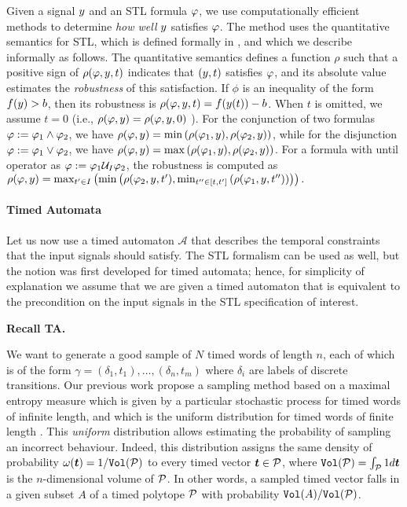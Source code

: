 Given a signal $y$ and an STL formula $\varphi$, we use computationally efficient methods to determine \emph{how well} $y$ satisfies $\varphi$.
The method uses the quantitative semantics for STL, which 
is defined formally in \cite{DonzeM10}, and which we describe informally as follows. The
quantitative semantics defines a function $\rho$ such that a positive sign of
$\rho(\varphi,y,t)$ indicates that $(y,t)$ satisfies
$\varphi$, and its absolute value estimates the \emph{robustness} of
this satisfaction. If $\phi$ is an inequality of the form
$f(y)>b$, then its robustness is $\rho(\varphi,y,t) = f(y(t))-b$.  
When $t$ is omitted, we assume $t=0$ (i.e., $\rho(\varphi,y)=\rho(\varphi,y,0)$ ).
For the conjunction of two
formulas $\varphi := \varphi_1 \wedge \varphi_2$, we have
$\rho(\varphi,y)=\min \left( \rho(\varphi_1,y),\rho(\varphi_2,y)\right)$,
while for the disjunction $\varphi := \varphi_1 \vee \varphi_2$, we have
$\rho(\varphi,y)=\max\left(\rho(\varphi_1,y),\rho(\varphi_2,y)\right)$.
For a formula with until operator as $\varphi := \varphi_1 \mathcal{U}_I \varphi_2$,
the robustness is computed as $\rho(\varphi,y) = \max_{t^\prime\in
  I}\left(\min\left(\rho(\varphi_2,y,t^\prime),\min_{t^{\prime\prime}\in
  [t,t^\prime]}\left(\rho(\varphi_1,y,t^{\prime\prime})\right)\right)\right).$


\paragraph{Timed Automata}
Let us now use a timed automaton $\mathcal{A}$ that describes the temporal constraints that the input signals should satisfy. The STL formalism can be used as well, but the notion was first developed for timed automata; hence, for simplicity of explanation we assume that we are given a timed automaton that is equivalent to the precondition on the input signals in the STL specification of interest. 

{\bf Recall TA.}

We want to generate a good sample of $N$ timed words of length $n$, each of which is of the form $\gamma = (\delta_1, t_1), \ldots, (\delta_n, t_m)$ where $\delta_i$ are labels of discrete transitions. Our previous work \cite{maxent,BBBK16} propose a sampling method based on a maximal entropy measure which is given by a particular stochastic process \cite{maxent} for timed words of infinite length, and which is the uniform distribution for timed words of finite length \cite{BBBK16}. This \emph{uniform} distribution allows estimating the probability of sampling an incorrect behaviour. Indeed, this distribution assigns the same density of probability $\omega(\vec t) = 1/\Vol(\tpol)$ to every timed vector $\vec t\in\tpol$, where $\Vol(\tpol)=\int_{\tpol} 1 d\vec t$ is the $n$-dimensional volume of $\mathcal{P}$. In other words, a sampled timed vector falls in a given subset $A$ of a timed polytope $\mathcal{P}$ with probability $\mathtt{Vol}(A)/\mathtt{Vol}(\mathcal{P})$. 


